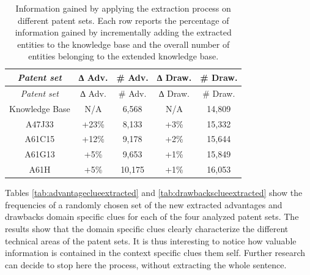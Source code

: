 \documentclass[]{book}
\begin{document}
\begin{longtable}[]{@{}ccccc@{}}
\caption{\label{tab:infogain1} Information gained by applying the extraction
process on different patent sets. Each row reports the percentage of
information gained by incrementally adding the extracted entities to the
knowledge base and the overall number of entities belonging to the
extended knowledge base.}\tabularnewline
\toprule
\emph{Patent set} & ∆ Adv. & \# Adv. & ∆ Draw. & \# Draw.\tabularnewline
\midrule
\endfirsthead
\toprule
\emph{Patent set} & ∆ Adv. & \# Adv. & ∆ Draw. & \# Draw.\tabularnewline
\midrule
\endhead
Knowledge Base & N/A & 6,568 & N/A & 14,809\tabularnewline
A47J33 & +23\% & 8,133 & +3\% & 15,332\tabularnewline
A61C15 & +12\% & 9,178 & +2\% & 15,644\tabularnewline
A61G13 & +5\% & 9,653 & +1\% & 15,849\tabularnewline
A61H & +5\% & 10,175 & +1\% & 16,053\tabularnewline
\bottomrule
\end{longtable}

Tables \ref{tab:advantageclueextracted} and
\ref{tab:drawbacksclueextracted} show the frequencies of a randomly
chosen set of the new extracted advantages and drawbacks domain specific
clues for each of the four analyzed patent sets. The results show that
the domain specific clues clearly characterize the different technical
areas of the patent sets. It is thus interesting to notice how valuable
information is contained in the context specific clues them self.
Further research can decide to stop here the process, without extracting
the whole sentence.
\end{document}
